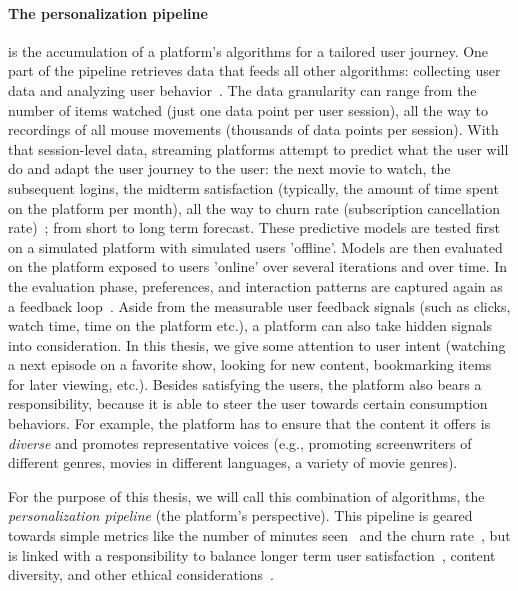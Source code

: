 \paragraph{The personalization pipeline} is the accumulation of a platform's algorithms for a tailored user journey. One part of the pipeline retrieves data that feeds all other algorithms: collecting user data and analyzing user behavior~\cite{behaviorals}.
The data granularity can range from the number of items watched (just one data point per user session), all the way to recordings of all mouse movements (thousands of data points per session). With that session-level data, streaming platforms attempt to predict what the user will do and adapt the user journey to the user: the next movie to watch, the subsequent logins, the midterm satisfaction (typically, the amount of time spent on the platform per month), all the way to churn rate (subscription cancellation rate)~\cite{longTerm}; from short to long term forecast. These predictive models are tested first on a simulated platform with simulated users 'offline'. Models are then evaluated on the platform exposed to users 'online' over several iterations and over time. In the evaluation phase, preferences, and interaction patterns are captured again as a feedback loop~\cite{offlineOnlineSurvey, NetflixReco}. Aside from the measurable user feedback signals (such as clicks, watch time, time on the platform etc.), a platform can also take hidden signals into consideration. In this thesis, we give some attention to user intent (watching a next episode on a favorite show, looking for new content, bookmarking items for later viewing, etc.). Besides satisfying the users, the platform also bears a responsibility, because it is able to steer the user towards certain consumption behaviors. For example, the platform has to ensure that the content it offers is \emph{diverse} and promotes representative voices (e.g., promoting screenwriters of different genres, movies in different languages, a variety of movie genres). %


For the purpose of this thesis, we will call this combination of algorithms, the \emph{personalization pipeline} (the platform's perspective). This pipeline is geared towards simple metrics like the number of minutes seen~\cite{spotifyIntent} and the churn rate~\cite{oldChurn}, but is linked with a responsibility to balance longer term user satisfaction~\cite{longTerm}, content diversity, and other ethical considerations~\cite{helberger}.

